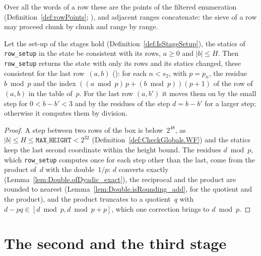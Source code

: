 Over all the words of a row these are the points of the filtered enumeration
(Definition~\ref{def:rowPoints}; ), and adjacent ranges
concatenate: the sieve of a row may proceed chunk by chunk and range by range.

\begin{lemma}\label{lem:rowSetup_spec}
  \leanok
  Let the set-up of the stages hold (Definition~\ref{def:IsStageSetup}), the statics of
  \texttt{row\_setup} in the state be consistent with its rows, $a \ge 0$ and $|b| \le H$. Then
  \texttt{row\_setup} returns the state with only its rows and its statics changed, these
  consistent for the last row~$(a, b)$ (): for each $n < s_2$, with
  $p = p_n$, the residue $b \bmod p$ and the index $((a \bmod p)\,p + (b \bmod p))(p + 1)$ of the
  row of~$(a, b)$ in the table of~$p$. For the last row $(a, b')$ it moves them on by the small
  step for $0 < b - b' < 3$ and by the residues of the step $d = b - b'$ for a larger step;
  otherwise it computes them by division.
\end{lemma}

\begin{proof}
  \leanok
  A step between two rows of the box is below~$2^{48}$, as
  $|b| \le H \le \texttt{MAX\_HEIGHT} < 2^{32}$ (Definition~\ref{def:CheckGlobals.WF}) and the
  statics keep the last second coordinate within the height bound. The residues $d \bmod p$, which
  \texttt{row\_setup} computes once for each step other than the last, come from
  the product of~$d$ with the double~$1/p$: $d$ converts exactly
  (Lemma~\ref{lem:Double.ofDyadic_exact}), the reciprocal and the product are rounded to nearest
  (Lemma~\ref{lem:Double.isRounding_add}, for the quotient and the product), and the product
  truncates to a quotient~$q$ with $d - p q \in [d \bmod p, d \bmod p + p]$, which one correction brings to
  $d \bmod p$.
\end{proof}

\section{The second and the third stage}\label{sec:stages23}

